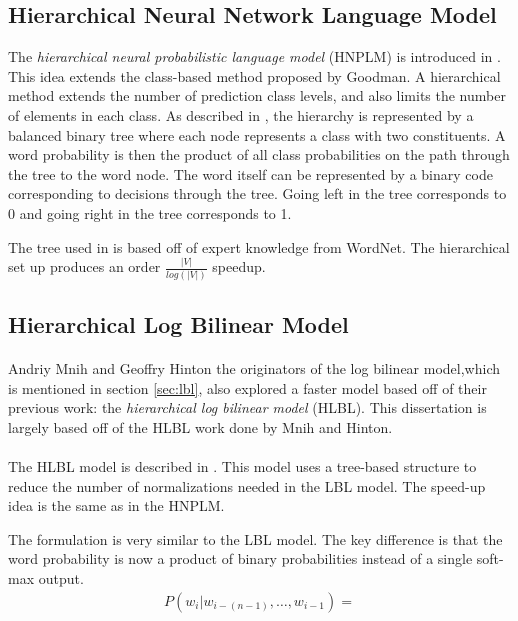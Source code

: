 \documentclass[12pt]{ociamthesis}
\begin{document}
\subsection{Hierarchical Neural Network Language Model}
The \emph{hierarchical neural probabilistic language model} (HNPLM) is introduced in \cite{MorinBengio2005}. This idea extends the class-based method proposed by Goodman. A hierarchical method extends the number of prediction class levels, and also limits the number of elements in each class. As described in \cite{MorinBengio2005}, the hierarchy is represented by a balanced binary tree where each node represents a class with two constituents.  A word probability is then the product of all class probabilities on the path through the tree to the word node. The word itself can be represented by a binary code corresponding to decisions through the tree. Going left in the tree corresponds to 0 and going right in the tree corresponds to 1.

The tree used in \cite{MorinBengio2005} is based off of expert knowledge from WordNet. The hierarchical set up produces an order $\frac{|V|}{log(|V|)}$ speedup.

\subsection{Hierarchical Log Bilinear Model}
\paragraph{}
Andriy Mnih and Geoffry Hinton the originators of the log bilinear model,which is mentioned in section \ref{sec:lbl},  also explored a faster model based off of their previous work: the \emph{hierarchical log bilinear model} (HLBL). This dissertation is largely based off of the HLBL work done by Mnih and Hinton. 

\paragraph{}
The HLBL model is described in \cite{MnihHinton2009}. This model uses a tree-based structure to reduce the number of normalizations needed in the LBL model. The speed-up idea is the same as in the HNPLM.

The formulation is very similar to the LBL model. The key difference is that the word probability is now a product of binary probabilities instead of a single soft-max output.
\begin{align}
P(w_i | w_{i-(n-1)},\dots, w_{i-1})  = 
\end{align}
\end{document}
